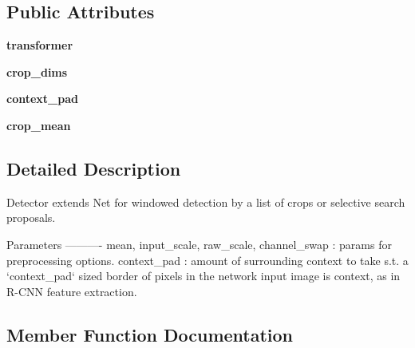 \subsection*{Public Attributes}
\begin{DoxyCompactItemize}
\item 
\hypertarget{classcaffe_1_1detector_1_1_detector_a6ab029f8b9627cd96f11b935e263549f}{}{\bfseries transformer}\label{classcaffe_1_1detector_1_1_detector_a6ab029f8b9627cd96f11b935e263549f}

\item 
\hypertarget{classcaffe_1_1detector_1_1_detector_a6e914f9d5071a3d5a41f7542f216e6d9}{}{\bfseries crop\+\_\+dims}\label{classcaffe_1_1detector_1_1_detector_a6e914f9d5071a3d5a41f7542f216e6d9}

\item 
\hypertarget{classcaffe_1_1detector_1_1_detector_a25b10b7dedec3c75c589cfbffa1271af}{}{\bfseries context\+\_\+pad}\label{classcaffe_1_1detector_1_1_detector_a25b10b7dedec3c75c589cfbffa1271af}

\item 
\hypertarget{classcaffe_1_1detector_1_1_detector_a2caeb79b367cfca8577c4fddc53ac956}{}{\bfseries crop\+\_\+mean}\label{classcaffe_1_1detector_1_1_detector_a2caeb79b367cfca8577c4fddc53ac956}

\end{DoxyCompactItemize}


\subsection{Detailed Description}
\begin{DoxyVerb}Detector extends Net for windowed detection by a list of crops or
selective search proposals.

Parameters
----------
mean, input_scale, raw_scale, channel_swap : params for preprocessing
    options.
context_pad : amount of surrounding context to take s.t. a `context_pad`
    sized border of pixels in the network input image is context, as in
    R-CNN feature extraction.
\end{DoxyVerb}
 

\subsection{Member Function Documentation}
\hypertarget{classcaffe_1_1detector_1_1_detector_a3706bb8bcd04387c065f7bb6b34f4875}{}
